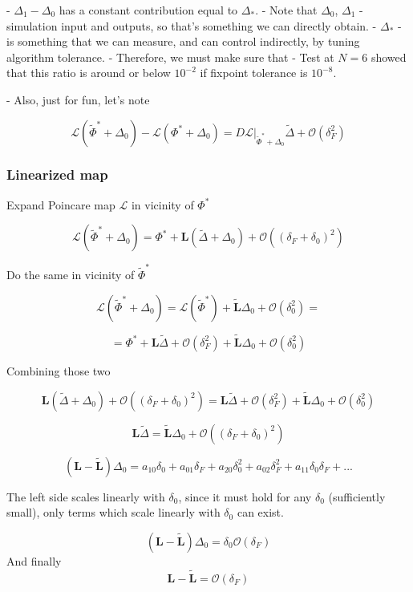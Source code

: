 \documentclass[a4paper,12pt]{article}
\newcommand{\wt}{\widetilde} %
\newcommand{\bigO}{\mathcal{O}}
\newcommand{\FP}{\Phi^*}%
\newcommand{\D}{\Delta}%
\newcommand{\Lmat}{\mathbf{L}}  %
\begin{document}
- $\D_1 - \D_0$ has a constant contribution equal to $\D_*$.
- Note that $\D_0$, $\D_1$ - simulation input and outputs, so that's something we can directly obtain.
- $ \D_* $ - is something that we can measure, and can control indirectly, by tuning
  algorithm tolerance.
- Therefore, we must make sure that
  - Test at $N=6$ showed that this ratio is around or below $10^{-2}$ if fixpoint tolerance is $10^{-8}$.

- Also, just for fun, let's note

$$
 \mathcal{L}(\wt \FP  + \D_0) - \mathcal{L}( \FP  + \D_0) = D\mathcal{L} \vert_{\wt \FP  + \D_0} \wt \D + \mathcal{O}(\delta_F^2)
$$


\subsubsection{Linearized map}
Expand Poincare map $\mathcal{L}$ in vicinity of $\FP$

$$
\mathcal{L}(\wt \FP+ \D_0)
= \FP +  \mathbf{L}  ( \wt \D +  \D_0 ) + \mathcal{O}(( \delta_F + \delta_0)^2)
$$ %

Do the same in vicinity of $\wt \FP$

$$
\mathcal{L}(\wt \FP + \D_0)
= \mathcal{L}(\wt \FP) +  \wt{\mathbf{L}} \D_0 + \mathcal{O}(\delta_0^2) =
$$

$$
=  \FP + \Lmat \wt \D + \mathcal{O}(\delta_F^2)  +  \wt{\mathbf{L}} \D_0 + \mathcal{O}(\delta_0^2)
$$%


Combining those two

$$
\mathbf{L}  ( \wt \D +  \D_0 ) + \mathcal{O}(( \delta_F + \delta_0)^2)
=
\Lmat \wt \D + \mathcal{O}(\delta_F^2)  +  \wt{\mathbf{L}} \D_0 + \mathcal{O}(\delta_0^2)
$$


$$
\mathbf{L} \wt \D 
=
 \wt{\mathbf{L}} \D_0 + \mathcal{O}(( \delta_F + \delta_0)^2)
$$

$$
(\mathbf{L} -  \wt{\mathbf{L}}) \D_0 
=
a_{10} \delta_0 + a_{01} \delta_F + a_{20}  \delta_0^2 + a_{02} \delta_F^2 + a_{11} \delta_0 \delta_F + ...
$$

The left side scales linearly with $\delta_0$, since it must hold for any $\delta_0$ (sufficiently small), only terms which scale linearly with $\delta_0$ can exist.

$$
(\mathbf{L} -  \wt{\mathbf{L}}) \D_0 
=
\delta_0 \bigO(\delta_F)
$$
And finally
$$
\mathbf{L} -  \wt{\mathbf{L}}
=
 \mathcal{O}(\delta_F)
$$
\end{document}
